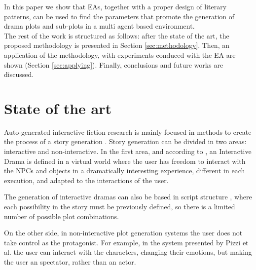 \documentclass{sig-alternate}
\begin{document}
In this paper we show that EAs, together with a proper design of
literary patterns, can be used to find the parameters that promote the
generation of drama plots and sub-plots in a multi agent based
environment.\\


The rest of the work is structured as follows: after the state of the art, the proposed methodology is presented in Section \ref{sec:methodology}. Then, an application of the methodology, with experiments conduced with the EA are shown (Section \ref{sec:applying}). Finally, conclusions and future works are discussed.


%
%


\section{State of the art}
\label{sec:soa}


Auto-generated interactive fiction research is mainly focused in
methods to create the process of a story generation
\cite{nairat2011character}. Story generation can be divided in two
areas: interactive and non-interactive. In the first area, and
according to \cite{ReviewArinbjarnar09}, an Interactive Drama is
defined in a virtual world where the user has freedom to interact with
the NPCs and objects in a dramatically interesting experience,
different in each execution, and adapted to the interactions of the
user. %

The generation of interactive dramas can also be based in script
structure \cite{ArchitectureYoung04}, where each possibility in the
story must be previously defined, so there is a limited number of
possible plot combinations.

On the other side, in non-interactive plot generation systems the user
does not take control as the protagonist. For example, in the system
presented by Pizzi et al. \cite{pizzi2007interactive} the user can
interact with the characters, changing their emotions, but making the
user an spectator, rather than an actor. %
\end{document}
